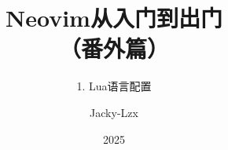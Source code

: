 \documentclass[17pt]{ctexbeamer}
\title{Neovim从入门到出门\\（番外篇）}
\subtitle{1. Lua语言配置}
\author{Jacky-Lzx}
\date{2025}
\begin{document}
\begin{frame}
  \titlepage
\end{frame}
\end{document}
